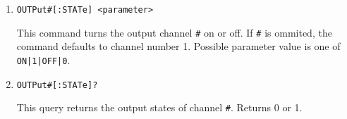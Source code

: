 \documentclass[a4paper,10pt]{article}
\begin{document}
\begin{enumerate}
\begin{enumerate}
		\item 
		    \begin{verbatim}OUTPut#[:STATe] <parameter>\end{verbatim}
		    \begin{description}
		        This command turns the output channel \verb!#! on or off. If \verb|#| is ommited, the command defaults to channel number 1.
		        \newline Possible parameter value is one of \verb!ON|1|OFF|0!.
		    \end{description}
		\item 
		    \begin{verbatim}OUTPut#[:STATe]?\end{verbatim}
		    \begin{description}
		        This query returns the output states of channel \verb!#!. Returns 0 or 1.
		    \end{description}
    \end{enumerate}
\end{enumerate}
\end{document}
